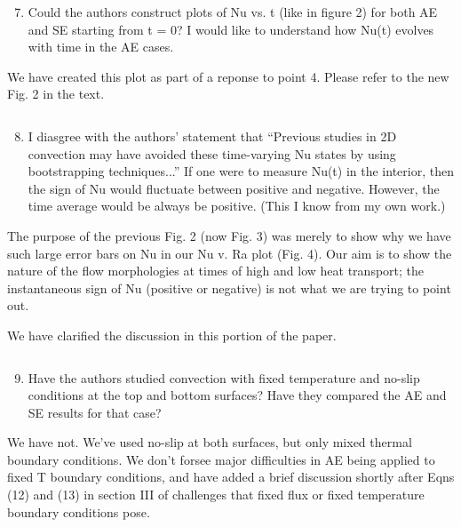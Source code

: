 \documentclass[aps, 11pt, singlecolumn]{revtex4-1} %
\begin{document}
\begin{singlespace}
\begin{myquotation}
$\,$\\\vspace{-1.25cm}
\begin{enumerate}
\setcounter{enumi}{6}
\item Could the authors construct plots of Nu vs. t (like in figure 2) for both AE and SE starting from t = 0? I would like to understand how Nu(t) evolves with time in the AE cases.
\end{enumerate}
\end{myquotation}
We have created this plot as part of a reponse to point 4. Please refer to the
new Fig. 2 in the text.

\begin{myquotation}
$\,$\\\vspace{-1.25cm}
\begin{enumerate}
\setcounter{enumi}{7}
\item I diasgree with the authors’ statement that “Previous studies in 2D convection may have avoided these time-varying Nu states by using bootstrapping techniques...” If one were to measure Nu(t) in the interior, then the sign of Nu would fluctuate between positive and negative. However, the time average would be always be positive. (This I know from my own work.)
\end{enumerate}
\end{myquotation}
The purpose of the previous Fig. 2 (now Fig. 3) was merely to show why we have
such large error bars on Nu in our Nu v. Ra plot (Fig. 4). Our aim is to show
the nature of the flow morphologies at times of high and low heat transport;
the instantaneous sign of Nu (positive or negative) is not what we are trying
to point out.

We have clarified the discussion in this portion of the paper.

\begin{myquotation}
$\,$\\\vspace{-1.25cm}
\begin{enumerate}
\setcounter{enumi}{8}
\item Have the authors studied convection with fixed temperature and no-slip conditions at the top and bottom surfaces? Have they compared the AE and SE results for that case?
\end{enumerate}
\end{myquotation}
We have not. We've used no-slip at both surfaces, 
but only mixed thermal boundary conditions. 
We don't forsee major difficulties in AE being applied to fixed T boundary 
conditions, and have added a brief discussion shortly after Eqns (12) and (13)
in section III of challenges that
fixed flux or fixed temperature boundary conditions pose.





\end{singlespace}





\end{document}
